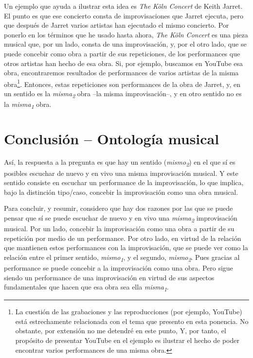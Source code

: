 \documentclass[]{book}
\begin{document}
Un ejemplo que ayuda a ilustrar esta idea es \emph{The} \emph{Köln
Concert} de Keith Jarret. El punto es que ese concierto consta de
improvisaciones que Jarret ejecuta, pero que después de Jarret varios
artistas han ejecutado el mismo concierto. Por ponerlo en los términos
que he usado hasta ahora, \emph{The Köln Concert} es una pieza musical
que, por un lado, consta de una improvisación, y, por el otro lado, que
se puede concebir como obra a partir de sus repeticiones, de los
performances que otros artistas han hecho de esa obra. Si, por ejemplo,
buscamos en YouTube esa obra, encontraremos resultados de performances
de varios artistas de la misma obra\footnote{La cuestión de las
  grabaciones y las reproducciones (por ejemplo, YouTube) está
  estrechamente relacionada con el tema que presento en esta ponencia.
  No obstante, por extensión no me detendré en este punto, Y, por tanto,
  el propósito de presentar YouTube en el ejemplo es ilustrar el hecho
  de poder encontrar varios performances de una misma obra.}. Entonces,
estas repeticiones son performances de la obra de Jarret, y, en un
sentido es la \emph{misma\textsubscript{2}} obra --la misma
improvisación--, y en otro sentido no es la
\emph{misma\textsubscript{1}} obra.

\section{Conclusión -- Ontología musical}

Así, la respuesta a la pregunta es que hay un sentido
(\emph{mismo\textsubscript{2}}) en el que sí es posibles escuchar de
nuevo y en vivo una misma improvisación musical. Y este sentido consiste
en escuchar un performance de la improvisación, lo que implica, bajo la
distinción tipo/caso, concebir la improvisación como una obra musical.

Para concluir, y resumir, considero que hay dos razones por las que se
puede pensar que sí se puede escuchar de nuevo y en vivo una
\emph{misma\textsubscript{2 }}improvisación musical. Por un lado,
concebir la improvisación como una obra a partir de su repetición por
medio de un performance. Por otro lado, en virtud de la relación que
mantienen estos performances con la improvisación, que se puede ver como
la relación entre el primer sentido, \emph{mismo\textsubscript{1}}, y el
segundo, \emph{mismo\textsubscript{2}}. Pues gracias al performance se
puede concebir a la improvisación como una obra. Pero sigue siendo un
performance de una improvisación en virtud de sus aspectos fundamentales
que hacen que esa obra sea ella \emph{misma\textsubscript{1}}.
\end{document}
